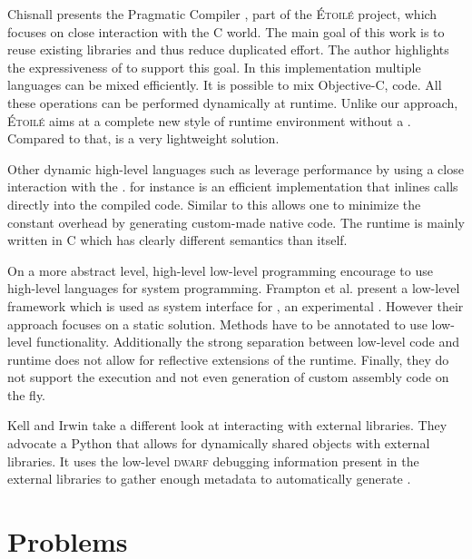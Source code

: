 Chisnall presents the Pragmatic \ST Compiler \cite{Chis12a}, part of the \textsc{Étoilé} project, which focuses on close interaction with the C world.
The main goal of this work is to reuse existing libraries and thus reduce duplicated effort.
The author highlights the expressiveness of \ST to support this goal.
In this \ST implementation multiple languages can be mixed efficiently.
It is possible to mix Objective-C, \ST code.
All these operations can be performed dynamically at runtime.
Unlike our approach, \textsc{Étoilé} aims at a complete new style of runtime environment without a \VM.
Compared to that, \NB is a very lightweight solution.


Other dynamic high-level languages such as \Lua leverage \FFI performance by using a close interaction with the \JIT.
 for instance is an efficient \Lua implementation that inlines \FFI calls directly into the \JIT compiled code.
Similar to \NB this allows one to minimize the constant overhead by generating custom-made native code.
The \LuaJIT runtime is mainly written in C which has clearly different semantics than \Lua itself.


On a more abstract level, high-level low-level programming \cite{Fram09a} encourage to use high-level languages for system programming.
Frampton et al. present a low-level framework  which is used as system interface for \Jikes, an experimental \Java \VM.
However their approach focuses on a static solution.
Methods have to be annotated to use low-level functionality.
Additionally the strong separation between low-level code and runtime does not allow for reflective extensions of the runtime.
Finally, they do not support the execution and not even generation of custom assembly code on the fly.


Kell and Irwin \cite{Kell11a} take a different look at interacting with external libraries.
They advocate a Python \VM that allows for dynamically shared objects with external libraries.
It uses the low-level \textsc{dwarf} debugging information present in the external libraries to gather enough metadata to automatically generate \FFIs.

\section{Problems}
 \\


